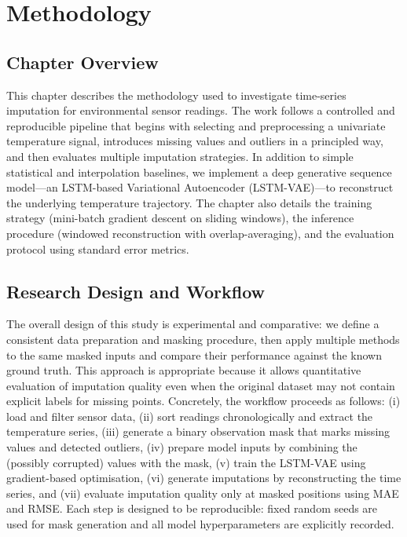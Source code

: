 
\chapter{Methodology}
\label{ch:methodology}

\section{Chapter Overview}
This chapter describes the methodology used to investigate time-series imputation for environmental sensor readings. The work follows a controlled and reproducible pipeline that begins with selecting and preprocessing a univariate temperature signal, introduces missing values and outliers in a principled way, and then evaluates multiple imputation strategies. In addition to simple statistical and interpolation baselines, we implement a deep generative sequence model---an LSTM-based Variational Autoencoder (LSTM-VAE)---to reconstruct the underlying temperature trajectory. The chapter also details the training strategy (mini-batch gradient descent on sliding windows), the inference procedure (windowed reconstruction with overlap-averaging), and the evaluation protocol using standard error metrics.

\section{Research Design and Workflow}
The overall design of this study is experimental and comparative: we define a consistent data preparation and masking procedure, then apply multiple methods to the same masked inputs and compare their performance against the known ground truth. This approach is appropriate because it allows quantitative evaluation of imputation quality even when the original dataset may not contain explicit labels for missing points. Concretely, the workflow proceeds as follows: (i) load and filter sensor data, (ii) sort readings chronologically and extract the temperature series, (iii) generate a binary observation mask that marks missing values and detected outliers, (iv) prepare model inputs by combining the (possibly corrupted) values with the mask, (v) train the LSTM-VAE using gradient-based optimisation, (vi) generate imputations by reconstructing the time series, and (vii) evaluate imputation quality only at masked positions using MAE and RMSE. Each step is designed to be reproducible: fixed random seeds are used for mask generation and all model hyperparameters are explicitly recorded.

